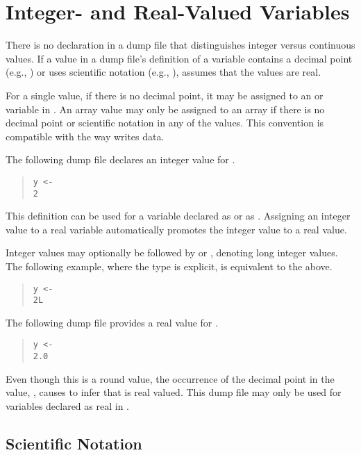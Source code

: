 \section{Integer- and Real-Valued Variables}

There is no declaration in a dump file that distinguishes integer
versus continuous values.  If a value in a dump file's definition of a
variable contains a decimal point (e.g., ) or uses
scientific notation (e.g., ), \Stan assumes that the
values are real.

For a single value, if there is no decimal point, it may be assigned
to an  or  variable in \Stan.  An array value may
only be assigned to an  array if there is no decimal point
or scientific notation in any of the values.  This convention is
compatible with the way \R writes data.

The following dump file declares an integer value for .
%
\begin{quote}
\begin{Verbatim} 
y <- 
2
\end{Verbatim}
\end{quote}
% 
This definition can be used for a \Stan variable  declared as
 or as .  Assigning an integer value to a real
variable automatically promotes the integer value to a real value.

Integer values may optionally be followed by  or ,
denoting long integer values.  The following example, where the type is
explicit, is equivalent to the above.
%
\begin{quote}
\begin{Verbatim} 
y <- 
2L
\end{Verbatim}
\end{quote}

The following dump file provides a real value for .
%
\begin{quote}
\begin{Verbatim}
y <-
2.0
\end{Verbatim}
\end{quote}
%
Even though this is a round value, the occurrence of the decimal
point in the value, , causes \Stan to infer that  is
real valued.  This dump file may only be used for variables 
declared as real in \Stan.

\subsection{Scientific Notation}

